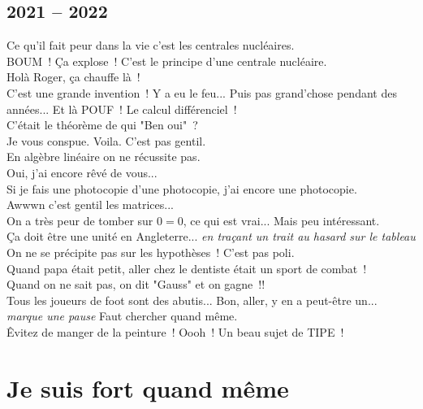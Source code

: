 \documentclass[french, a4paper, openany]{book}
\begin{document}
	\subsection*{2021 -- 2022}
		\noindent \og Ce qu'il fait peur dans la vie c'est les centrales nucléaires. \fg \\
		\og BOUM~! Ça explose~! C'est le principe d'une centrale nucléaire. \fg \\
		\og Holà Roger, ça chauffe là~! \fg \\
		\og C'est une grande invention~! Y a eu le feu... Puis pas grand'chose pendant des années... Et là POUF~! Le calcul différenciel~! \fg \\
		\og C'était le théorème de qui "Ben oui"~? \fg \\
		\og Je vous conspue. Voila. C'est pas gentil. \fg \\
		\og En algèbre linéaire on ne récussite pas. \fg \\
		\og Oui, j'ai encore rêvé de vous... \fg \\
		\og Si je fais une photocopie d'une photocopie, j'ai encore une photocopie. \fg \\
		\og Awwwn c'est gentil les matrices... \fg \\
		\og On a très peur de tomber sur $0 = 0$, ce qui est vrai... Mais peu intéressant. \fg \\
		\og Ça doit être une unité en Angleterre... \fg \emph{en traçant un trait au hasard sur le tableau} \\
		\og On ne se précipite pas sur les hypothèses~! C'est pas poli. \fg \\
		\og Quand papa était petit, aller chez le dentiste était un sport de combat~! \fg \\
		\og Quand on ne sait pas, on dit "Gauss" et on gagne~!! \fg \\
		\og Tous les joueurs de foot sont des abutis... Bon, aller, y en a peut-être un... \emph{marque une pause} Faut chercher quand même. \fg \\
		\og Êvitez de manger de la peinture~! Oooh~! Un beau sujet de TIPE~! \fg \\

\section*{Je suis fort quand même}
\end{document}
